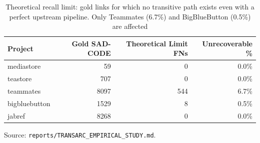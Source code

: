 \begin{table}[htbp]
  \centering
  \caption{Theoretical recall limit: \sadcode gold links for which no transitive path exists even with a perfect upstream pipeline. Only Teammates (6.7\%) and BigBlueButton (0.5\%) are affected}
  \label{tab:theoretical-limit}
  \begin{tabular}{lrrr}
    \toprule
    Project & Gold SAD-CODE & Theoretical Limit FNs & Unrecoverable \% \\
    \midrule
    mediastore & 59 & 0 & 0.0\% \\
    teastore & 707 & 0 & 0.0\% \\
    teammates & 8097 & 544 & 6.7\% \\
    bigbluebutton & 1529 & 8 & 0.5\% \\
    jabref & 8268 & 0 & 0.0\% \\
    \bottomrule
  \end{tabular}
  \par\smallskip\footnotesize Source: \texttt{reports/TRANSARC\_EMPIRICAL\_STUDY.md}.
\end{table}
